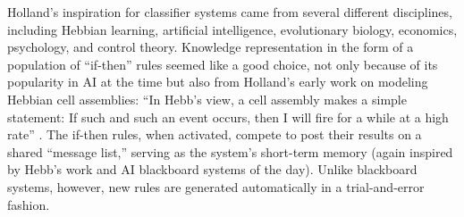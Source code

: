\documentclass{sig-alternate}
\begin{document}






Holland's inspiration for classifier systems came from several
different disciplines, including Hebbian
learning, artificial intelligence, evolutionary biology, economics,
psychology, and control theory.
Knowledge representation in the form of a
population of ``if-then'' rules seemed like a good choice, not only
because of its popularity in AI at the time but also from Holland's
early work on modeling Hebbian cell assemblies: ``In Hebb's view, a
cell assembly makes a simple statement: If such and such an event
occurs, then I will fire for a while at a high
rate'' \cite{Waldrop1993}. 
The if-then rules, when activated, compete to post their results on a
shared ``message list,'' serving as the system's short-term memory
(again inspired by Hebb's work and AI blackboard systems of the day).
Unlike blackboard systems, however, new rules are generated automatically
in a trial-and-error fashion.
\end{document}
